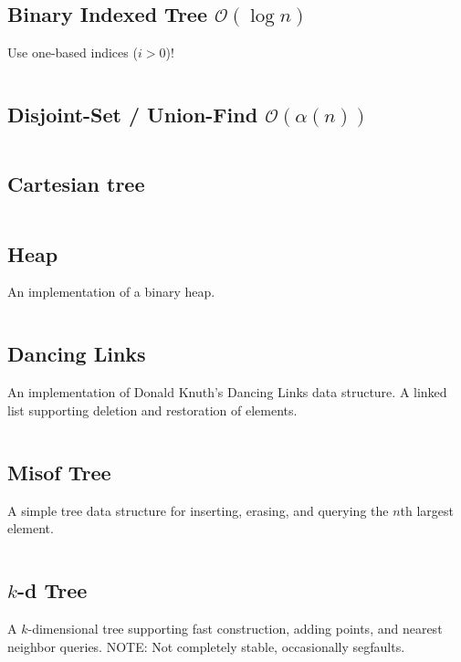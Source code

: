 \documentclass[8pt,a4paper,landscape,oneside]{amsart}
\newcommand{\mintedstyle}[2]{\inputminted[fontsize=\normalsize,baselinestretch=.9,breaklines,breakautoindent,tabsize=2]{#1}{code/#2}}
\newcommand{\code}[1]{\mintedstyle{cpp}{#1}}
\begin{document}
\begin{multicols*}{3}
\subsection{Binary Indexed Tree $\mathcal{O}(\log n)$}

Use one-based indices ($i > 0$)!
\code{datastructures/bit.cpp}

\subsection{Disjoint-Set / Union-Find $\mathcal{O}(\alpha (n))$}
\code{datastructures/dsu.cpp}


\subsection{Cartesian tree}
\code{datastructures/cartesian_tree.cpp}

\subsection{Heap}
An implementation of a binary heap.
\code{datastructures/heap.cpp}

\subsection{Dancing Links}
An implementation of Donald Knuth's Dancing Links data structure. A
linked list supporting deletion and restoration of elements.
\code{datastructures/dancing_links.cpp}

\subsection{Misof Tree}
A simple tree data structure for inserting, erasing, and querying the
$n$th largest element.
\code{datastructures/misof_tree.cpp}

\subsection{$k$-d Tree}
A $k$-dimensional tree supporting fast construction, adding points, and
nearest neighbor queries.
NOTE: Not completely stable, occasionally segfaults.
\code{datastructures/kd_tree.cpp}


\end{multicols*}
\end{document}
